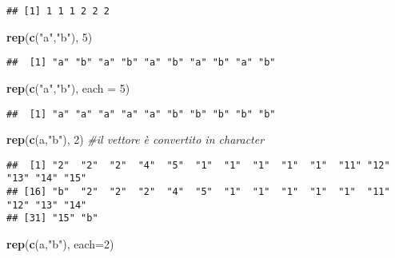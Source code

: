 \documentclass[
]{article}
\newenvironment{Shaded}{\begin{snugshade}}{\end{snugshade}}
\newcommand{\AttributeTok}[1]{\textcolor[rgb]{0.13,0.29,0.53}{#1}}
\newcommand{\CommentTok}[1]{\textcolor[rgb]{0.56,0.35,0.01}{\textit{#1}}}
\newcommand{\DecValTok}[1]{\textcolor[rgb]{0.00,0.00,0.81}{#1}}
\newcommand{\FunctionTok}[1]{\textcolor[rgb]{0.13,0.29,0.53}{\textbf{#1}}}
\newcommand{\NormalTok}[1]{#1}
\newcommand{\StringTok}[1]{\textcolor[rgb]{0.31,0.60,0.02}{#1}}
\begin{document}
\begin{verbatim}
## [1] 1 1 1 2 2 2
\end{verbatim}

\begin{Shaded}
\begin{Highlighting}[]
\FunctionTok{rep}\NormalTok{(}\FunctionTok{c}\NormalTok{(}\StringTok{"a"}\NormalTok{,}\StringTok{"b"}\NormalTok{), }\DecValTok{5}\NormalTok{)}
\end{Highlighting}
\end{Shaded}

\begin{verbatim}
##  [1] "a" "b" "a" "b" "a" "b" "a" "b" "a" "b"
\end{verbatim}

\begin{Shaded}
\begin{Highlighting}[]
\FunctionTok{rep}\NormalTok{(}\FunctionTok{c}\NormalTok{(}\StringTok{"a"}\NormalTok{,}\StringTok{"b"}\NormalTok{), }\AttributeTok{each =} \DecValTok{5}\NormalTok{)}
\end{Highlighting}
\end{Shaded}

\begin{verbatim}
##  [1] "a" "a" "a" "a" "a" "b" "b" "b" "b" "b"
\end{verbatim}

\begin{Shaded}
\begin{Highlighting}[]
\FunctionTok{rep}\NormalTok{(}\FunctionTok{c}\NormalTok{(a,}\StringTok{"b"}\NormalTok{), }\DecValTok{2}\NormalTok{)          }\CommentTok{\#il vettore è convertito in character}
\end{Highlighting}
\end{Shaded}

\begin{verbatim}
##  [1] "2"  "2"  "2"  "4"  "5"  "1"  "1"  "1"  "1"  "1"  "11" "12" "13" "14" "15"
## [16] "b"  "2"  "2"  "2"  "4"  "5"  "1"  "1"  "1"  "1"  "1"  "11" "12" "13" "14"
## [31] "15" "b"
\end{verbatim}

\begin{Shaded}
\begin{Highlighting}[]
\FunctionTok{rep}\NormalTok{(}\FunctionTok{c}\NormalTok{(a,}\StringTok{"b"}\NormalTok{), }\AttributeTok{each=}\DecValTok{2}\NormalTok{) }
\end{Highlighting}
\end{Shaded}
\end{document}

